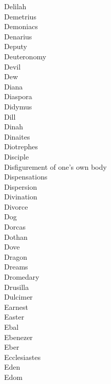 Delilah  \\
Demetrius  \\
Demoniacs  \\
Denarius  \\
Deputy  \\
Deuteronomy  \\
Devil  \\
Dew  \\
Diana  \\
Diaspora  \\
Didymus  \\
Dill  \\
Dinah  \\
Dinaites  \\
Diotrephes  \\
Disciple  \\
Disfigurement of one’s own body  \\
Dispensations  \\
Dispersion  \\
Divination  \\
Divorce  \\
Dog  \\
Dorcas  \\
Dothan  \\
Dove  \\
Dragon  \\
Dreams  \\
Dromedary  \\
Drusilla  \\
Dulcimer  \\
Earnest  \\
Easter  \\
Ebal  \\
Ebenezer  \\
Eber  \\
Ecclesiastes  \\
Eden  \\
Edom  \\
